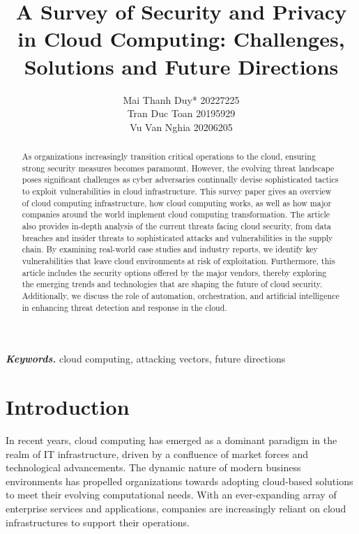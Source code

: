 \documentclass[twocolumn]{article}
\providecommand{\keywords}[1]{\textbf{\textit{Keywords.}} #1}
\let\oldmaketitle\maketitle
\renewcommand{\maketitle}{
\thispagestyle{empty}
\oldmaketitle
}
\begin{document}
\title{A Survey of Security and Privacy in Cloud Computing: Challenges, Solutions and Future Directions}
\author{
Mai Thanh Duy{*} 20227225 \\
Tran Duc Toan 20195929 \\
Vu Van Nghia 20206205
}

\date{}

\maketitle
\begin{abstract}
As organizations increasingly transition critical operations to the cloud, ensuring strong security measures becomes paramount. However, the evolving threat landscape poses significant challenges as cyber adversaries continually devise sophisticated tactics to exploit vulnerabilities in cloud infrastructure. This survey paper gives an overview of cloud computing infrastructure, how cloud computing works, as well as how major companies around the world implement cloud computing transformation. The article also provides in-depth analysis of the current threats facing cloud security, from data breaches and insider threats to sophisticated attacks and vulnerabilities in the supply chain. By examining real-world case studies and industry reports, we identify key vulnerabilities that leave cloud environments at risk of exploitation. Furthermore, this article includes the security options offered by the major vendors, thereby exploring the emerging trends and technologies that are shaping the future of cloud security. Additionally, we discuss the role of automation, orchestration, and artificial intelligence in enhancing threat detection and response in the cloud.
\end{abstract}

\keywords{cloud computing, attacking vectors, future directions}
\section{Introduction}

In recent years, cloud computing has emerged as a dominant paradigm in the realm of IT infrastructure, driven by a confluence of market forces and technological advancements. The dynamic nature of modern business environments has propelled organizations towards adopting cloud-based solutions to meet their evolving computational needs. With an ever-expanding array of enterprise services and applications, companies are increasingly reliant on cloud infrastructures to support their operations.
\end{document}
